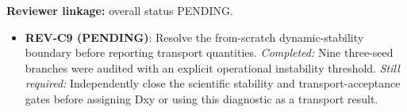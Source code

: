 \textbf{Reviewer linkage:} overall status PENDING.
\begin{itemize}[leftmargin=1.4em,noitemsep]
\item \textbf{REV-C9 (PENDING)}: Resolve the from-scratch dynamic-stability boundary before reporting transport quantities. \emph{Completed:} Nine three-seed branches were audited with an explicit operational instability threshold. \emph{Still required:} Independently close the scientific stability and transport-acceptance gates before assigning Dxy or using this diagnostic as a transport result.
\end{itemize}
